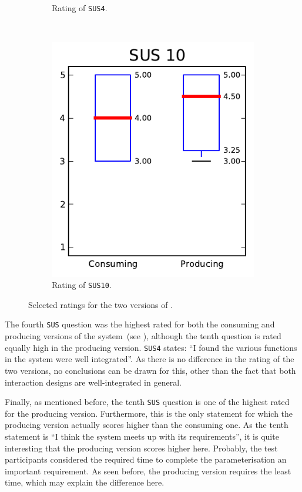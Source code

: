 \begin{figure}
\begin{subfigure}[t]{0.32\textwidth}
\caption{Rating of \texttt{SUS4}.}
\end{subfigure}%
~
\begin{subfigure}[t]{0.32\textwidth}
\centering
\includegraphics[width=\textwidth]{img/graphs/4a_09.pdf}
\caption{Rating of \texttt{SUS10}.}
\end{subfigure}
\caption{Selected ratings for the two versions of \oframp.}
\end{figure}

The fourth \verb|SUS| question was the highest rated for both the consuming and producing versions of the system~(see ), although the tenth question is rated equally high in the producing version. \verb|SUS4| states: ``I found the various functions in the system were well integrated''. As there is no difference in the rating of the two versions, no conclusions can be drawn for this, other than the fact that both interaction designs are well-integrated in general.

Finally, as mentioned before, the tenth \verb|SUS| question is one of the highest rated for the producing version. Furthermore, this is the only statement for which the producing version actually scores higher than the consuming one. As the tenth statement is ``I think the system meets up with its requirements'', it is quite interesting that the producing version scores higher here. Probably, the test participants considered the required time to complete the parameterisation an important requirement. As seen before, the producing version requires the least time, which may explain the difference here.


